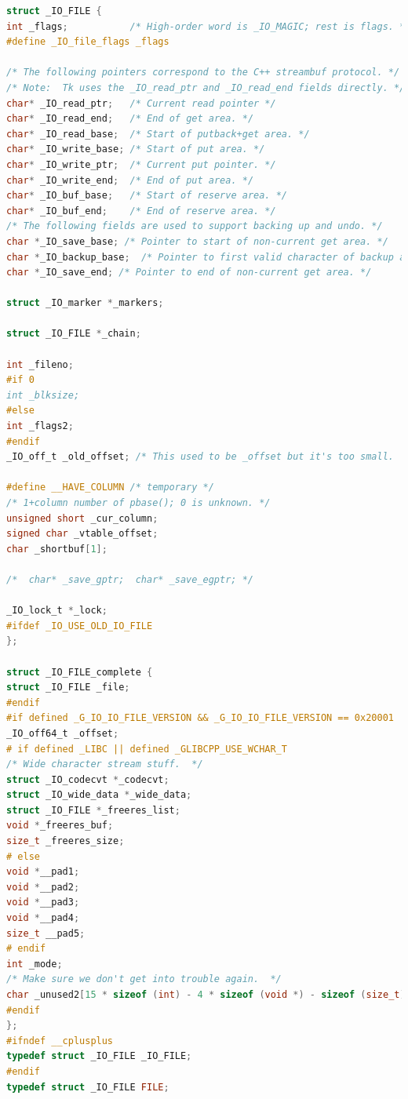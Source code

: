 \begin{lstlisting}[language=c,label=some-code4,caption=Структура FILE]
struct _IO_FILE {
int _flags;           /* High-order word is _IO_MAGIC; rest is flags. */
#define _IO_file_flags _flags

/* The following pointers correspond to the C++ streambuf protocol. */
/* Note:  Tk uses the _IO_read_ptr and _IO_read_end fields directly. */
char* _IO_read_ptr;   /* Current read pointer */
char* _IO_read_end;   /* End of get area. */
char* _IO_read_base;  /* Start of putback+get area. */
char* _IO_write_base; /* Start of put area. */
char* _IO_write_ptr;  /* Current put pointer. */
char* _IO_write_end;  /* End of put area. */
char* _IO_buf_base;   /* Start of reserve area. */
char* _IO_buf_end;    /* End of reserve area. */
/* The following fields are used to support backing up and undo. */
char *_IO_save_base; /* Pointer to start of non-current get area. */
char *_IO_backup_base;  /* Pointer to first valid character of backup area */
char *_IO_save_end; /* Pointer to end of non-current get area. */

struct _IO_marker *_markers;

struct _IO_FILE *_chain;

int _fileno;
#if 0
int _blksize;
#else
int _flags2;
#endif
_IO_off_t _old_offset; /* This used to be _offset but it's too small.  */

#define __HAVE_COLUMN /* temporary */
/* 1+column number of pbase(); 0 is unknown. */
unsigned short _cur_column;
signed char _vtable_offset;
char _shortbuf[1];

/*  char* _save_gptr;  char* _save_egptr; */

_IO_lock_t *_lock;
#ifdef _IO_USE_OLD_IO_FILE
};

struct _IO_FILE_complete {
struct _IO_FILE _file;
#endif
#if defined _G_IO_IO_FILE_VERSION && _G_IO_IO_FILE_VERSION == 0x20001
_IO_off64_t _offset;
# if defined _LIBC || defined _GLIBCPP_USE_WCHAR_T
/* Wide character stream stuff.  */
struct _IO_codecvt *_codecvt;
struct _IO_wide_data *_wide_data;
struct _IO_FILE *_freeres_list;
void *_freeres_buf;
size_t _freeres_size;
# else
void *__pad1;
void *__pad2;
void *__pad3;
void *__pad4;
size_t __pad5;
# endif
int _mode;
/* Make sure we don't get into trouble again.  */
char _unused2[15 * sizeof (int) - 4 * sizeof (void *) - sizeof (size_t)];
#endif
};
#ifndef __cplusplus
typedef struct _IO_FILE _IO_FILE;
#endif
typedef struct _IO_FILE FILE;

\end{lstlisting}

